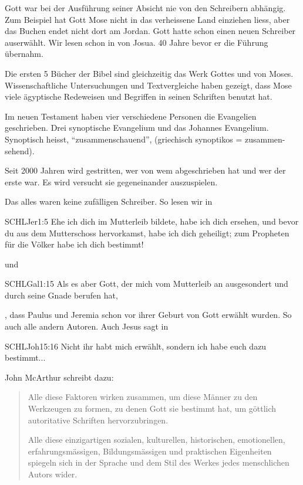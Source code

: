 Gott war bei der Ausführung seiner Absicht nie von den Schreibern abhängig. Zum Beispiel hat Gott Mose nicht in das verheissene Land einziehen liess, aber das Buchen endet nicht dort am Jordan. Gott hatte schon einen neuen Schreiber auserwählt. Wir lesen schon in  von Josua. 40 Jahre bevor er die Führung übernahm.

Die ersten 5 Bücher der Bibel sind gleichzeitig das Werk Gottes und von Moses. Wissenschaftliche Untersuchungen und Textvergleiche haben gezeigt, dass Mose viele ägyptische Redeweisen und Begriffen in seinen Schriften benutzt hat.

Im neuen Testament haben vier verschiedene Personen die Evangelien geschrieben. Drei synoptische Evangelium und das Johannes Evangelium. Synoptisch heisst, \enquote{zusammenschauend}, (griechisch synoptikos = zusammen-sehend).

Seit 2000 Jahren wird gestritten, wer von wem abgeschrieben hat und wer der erste war. Es wird versucht sie gegeneinander auszuspielen.

Das alles waren keine zufälligen Schreiber. So lesen wir in  
\begin{bibelbox}{SCHL}{Jer}{1:5}
Ehe ich dich im Mutterleib bildete, habe ich dich ersehen, und bevor du aus dem Mutterschoss hervorkamst, habe ich dich geheiligt; zum Propheten für die Völker habe ich dich bestimmt!
\end{bibelbox}
und 
\begin{bibelbox}{SCHL}{Gal}{1:15}
Als es aber Gott, der mich vom Mutterleib an ausgesondert und durch seine Gnade berufen hat,
\end{bibelbox}
, dass Paulus und Jeremia schon vor ihrer Geburt von Gott erwählt wurden. So auch alle andern Autoren. Auch Jesus sagt in 
\begin{bibelbox}{SCHL}{Joh}{15:16}
Nicht ihr habt mich erwählt, sondern ich habe euch dazu bestimmt...
\end{bibelbox}

John McArthur schreibt dazu:
\begin{quote}    
    Alle diese Faktoren wirken zusammen, um diese Männer zu den Werkzeugen zu formen, zu denen Gott sie bestimmt hat, um göttlich autoritative Schriften hervorzubringen.
    
    Alle diese einzigartigen sozialen, kulturellen, historischen, emotionellen, erfahrungsmässigen, Bildungsmässigen und praktischen Eigenheiten spiegeln sich in der Sprache und dem Stil des Werkes jedes menschlichen Autors wider.
\end{quote}

